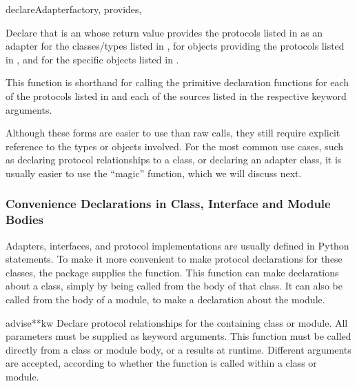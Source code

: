 \begin{verbatim%
}
\begin{verbatim%
}
\begin{verbatim%
}
\begin{verbatim%
}
\begin{verbatim%
}
\begin{verbatim%
}
\begin{funcdesc}{declareAdapter}{factory, provides,
 
}

Declare that  is an  whose return value
provides the protocols listed in  as an adapter for the
classes/types listed in , for objects providing the protocols
listed in , and for the specific objects listed in
.

This function is shorthand for calling the primitive declaration
functions for each of the protocols listed in  and each of the
sources listed in the respective keyword arguments.
\end{funcdesc}

Although these forms are easier to use than raw 
calls, they still require explicit reference to the types or objects involved.
For the most common use cases, such as declaring protocol relationships to a
class, or declaring an adapter class, it is usually easier to use the ``magic''
 function, which we will discuss next.



















\subsubsection{Convenience Declarations in Class, Interface and Module Bodies \label{protcols-advise}}

Adapters, interfaces, and protocol implementations are usually defined in
Python  statements.  To make it more convenient to make protocol
declarations for these classes, the  package supplies the
 function.  This function  can make declarations about a
class, simply by being called from the body of that class.  It can also be
called from the body of a module, to make a declaration about the module.

\begin{funcdesc}{advise}{**kw}
Declare protocol relationships for the containing class or module.  All
parameters must be supplied as keyword arguments.  This function must be
called directly from a class or module body, or a 
results at runtime.  Different arguments are accepted, according to whether
the function is called within a class or module.


\end{funcdesc}
\end{verbatim%
}
\end{verbatim%
}
\end{verbatim%
}
\end{verbatim%
}
\end{verbatim%
}
\end{verbatim%
}

